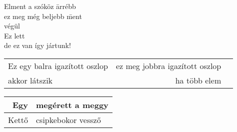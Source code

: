 \documentclass[a4paper]{article}
\begin{document}
\begin{tabbing}
Elment a szóköz \= arrébb\\
\> ez meg még beljebb \= ment\\
\> \> végül \\
Ez lett \=\\
\> de ez van \> így jártunk!
\end{tabbing}

\begin{tabular}{|lrc|}
Ez egy balra igazított oszlop & ez meg jobbra igazított oszlop
\\
akkor látszik & ha több elem
\end{tabular}

\begin{tabular}{|r|l|}
\hline
Egy & megérett a meggy \\
\hline
Kettő & csipkebokor vessző \\
\hline
\end{tabular} 
\end{document}
